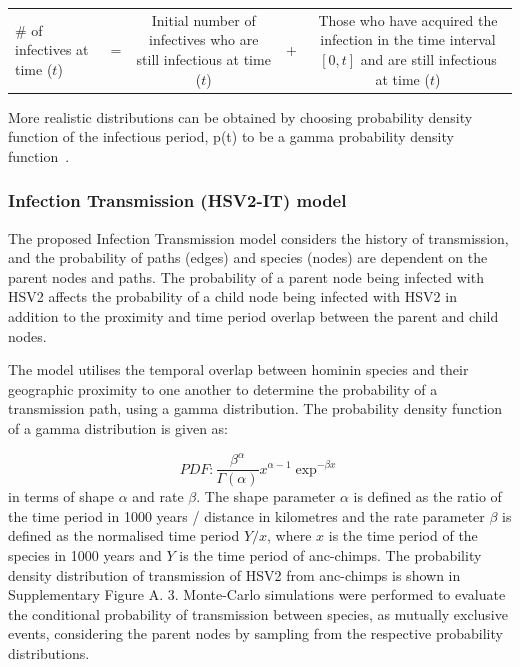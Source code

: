 \documentclass[fleqn,10pt]{wlscirep}
\begin{document}
\begin{table}[!h]
	\centering
	\renewcommand{\arraystretch}{1.5}
	\begin{tabulary}{\linewidth}{LCCCC}
		\# of infectives at time ($t$) & =  & 
		Initial number of infectives who are still infectious at time ($t$) & + & 
		Those who have acquired the infection in the time interval $[0, t]$ and are still infectious at time ($t$)			\\ 
	\end{tabulary}
\end{table}

More realistic distributions can be obtained by choosing  probability density function of the infectious period,  p(t) to be a gamma probability density function~\citep{Blythe1988,Lloyd2001}.

\subsubsection*{Infection Transmission (HSV2-IT) model}
The proposed Infection Transmission model considers the history of transmission, and the probability of paths (edges) and species (nodes) are dependent on the parent nodes and paths. The probability of a parent node being infected with HSV2 affects the probability of a child node being infected with HSV2 in addition to the proximity and time period overlap between the parent and child nodes. 

The model utilises the temporal overlap between hominin species and their geographic proximity to one another to determine the probability of a transmission path, using a gamma distribution.  The probability density function of a gamma distribution is given as:

\begin{equation}
PDF:\frac{\beta^\alpha}{\Gamma(\alpha)}x^{\alpha - 1} \exp^{-\beta x}
\end{equation}
in terms of shape $\alpha$ and rate $\beta$. The shape parameter $\alpha$ is defined as the ratio of the time period in 1000 years / distance in kilometres and the rate parameter $\beta$ is defined as the normalised time period $Y / x$, where $x$ is the time period of the species in 1000 years and $Y$ is the time period of anc-chimps. The probability density distribution of transmission of HSV2 from anc-chimps is shown in Supplementary Figure A. 3. Monte-Carlo simulations were performed to evaluate the conditional probability of transmission between species, as mutually exclusive events, considering the parent nodes by sampling from the respective probability distributions. 
\end{document}
